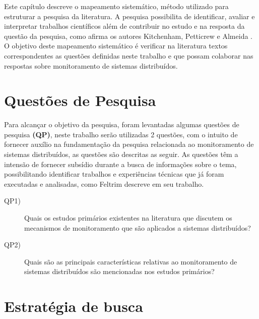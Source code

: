 \label{mapeamento_sistematico}

Este capítulo descreve o mapeamento sistemático, método utilizado para estruturar a pesquisa da literatura. A pesquisa possibilita de identificar, avaliar e interpretar trabalhos científicos além de contribuir no estudo e na resposta da questão da pesquisa, como afirma os autores Kitchenham, Petticrew e Almeida \cite{kitchenham2007guidelines,petticrew2008systematic,de2018mapeamento}. O objetivo deste mapeamento sistemático é verificar na literatura textos correspondentes as questões definidas neste trabalho e que possam colaborar nas respostas sobre monitoramento de sistemas distribuídos.


\section{Questões de Pesquisa}
\label{questoes1e2}

Para alcançar o objetivo da pesquisa, foram levantadas algumas questões de pesquisa \textbf{(QP)}, neste trabalho serão utilizadas 2 questões, com o intuito de fornecer auxílio na fundamentação da pesquisa relacionada ao monitoramento de sistemas distribuídos, as questões são descritas as seguir. As questões têm a intensão de fornecer subsídio durante a busca de informações sobre o tema, possibilitando identificar trabalhos e experiências técnicas que já foram executadas e analisadas, como Feltrim\cite{feltrim2004abordagem} descreve em seu trabalho.

\begin{description}
\item[QP1)] Quais os estudos primários existentes na literatura que discutem os mecanismos de monitoramento 
que são aplicados a sistemas distribuídos?
\item[QP2)] Quais são as principais características relativas ao monitoramento de sistemas distribuídos são mencionadas nos estudos primários?
\end{description}


\section{Estratégia de busca}
\label{sec:stringbusca}

